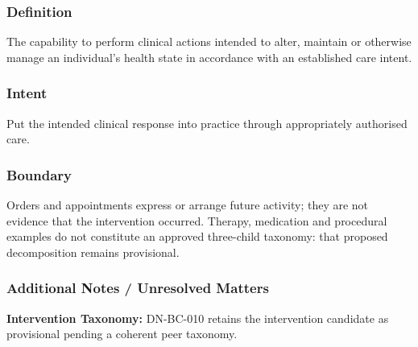 \subsubsection*{Definition}

The capability to perform clinical actions intended to alter, maintain or otherwise manage an individual's health state in accordance with an established care intent.

\subsubsection*{Intent}

Put the intended clinical response into practice through appropriately authorised care.

\subsubsection*{Boundary}

Orders and appointments express or arrange future activity; they are not evidence that the intervention occurred. Therapy, medication and procedural examples do not constitute an approved three-child taxonomy: that proposed decomposition remains provisional.

\subsubsection*{Additional Notes / Unresolved Matters}
\textbf{Intervention Taxonomy:} DN-BC-010 retains the intervention candidate as provisional pending a coherent peer taxonomy.

